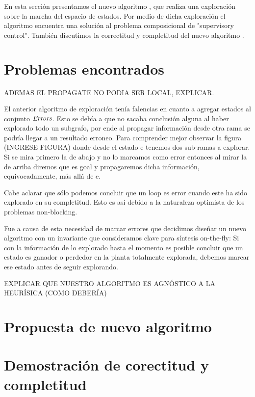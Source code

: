 En esta sección presentamos el nuevo algoritmo \DCS, que realiza una exploración sobre la marcha del espacio de estados. Por medio de dicha exploración el algoritmo encuentra una solución al problema composicional de "supervisory control". También discutimos la correctitud y completitud del nuevo algoritmo \DCS. \\

\section{Problemas encontrados}

ADEMAS EL PROPAGATE NO PODIA SER LOCAL, EXPLICAR.

El anterior algoritmo de exploración tenía falencias en cuanto a agregar estados al conjunto $\mathit{Errors}$. Esto se debía a que no sacaba conclusión alguna al haber explorado todo un subgrafo, por ende al propagar información desde otra rama se podría llegar a un resultado erroneo. Para comprender mejor observar la figura (INGRESE FIGURA) donde desde el estado e tenemos dos sub-ramas a explorar. Si se mira primero la de abajo y no lo marcamos como error entonces al mirar la de arriba diremos que es goal y propagaremos dicha información, equivocadamente, más allá de e.

Cabe aclarar que sólo podemos concluir que un loop es error cuando este ha sido explorado en su completitud. Esto es así debido a la naturaleza optimista de los problemas non-blocking.

Fue a causa de esta necesidad de marcar errores que decidimos diseñar un nuevo algoritmo con un invariante que consideramos clave para síntesis on-the-fly: Si con la información de lo explorado hasta el momento es posible concluir que un estado es ganador o perdedor en la planta totalmente explorada, debemos marcar ese estado antes de seguir explorando.

EXPLICAR QUE NUESTRO ALGORITMO ES AGNÓSTICO A LA HEURÍSICA (COMO DEBERÍA)


\section{Propuesta de nuevo algoritmo}



\FloatBarrier

\section{Demostración de corectitud y completitud}

